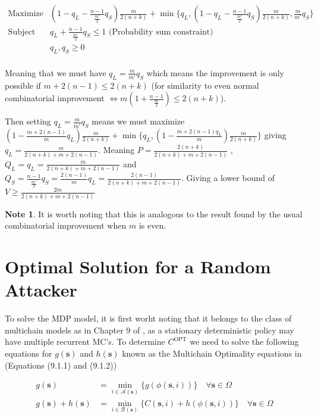 \documentclass[a4paper,10pt]{article}
\theoremstyle{definition}
\theoremstyle{definition}
\theoremstyle{remark}
\theoremstyle{definition}
\newtheorem*{note}{Note}
\begin{document}
$$\begin{array}{cc}
\text{Maximize} & (1-q_{L}-\frac{n-1}{ \frac{m'}{2}}q_{S}) \frac{m}{2(n+k)} + \min \{ q_{L}, (1-q_{L}-\frac{n-1}{\frac{m'}{2}}q_{S}) \frac{m}{2(n+k)} , \frac{m}{m'}q_{S} \}\\
\text{Subject to } & q_{L}+\frac{n-1}{\frac{m'}{2}}q_{S} \leq 1 \text{  (Probability sum constraint)} \\
     & q_{L},q_{S} \geq 0 \\
\end{array} $$

Meaning that we must have $q_{L}=\frac{m}{m'}q_{S}$ which means the improvement is only possible if $m+2(n-1) \leq 2(n+k)$ (for similarity to even normal combinatorial improvement $\iff m(1+\frac{n-1}{\frac{m}{2}}) \leq 2(n+k)$). 

Then setting $q_{L}=\frac{m}{m'}q_{S}$ means we must maximize $(1-\frac{m+2(n-1)}{m}q_{L})\frac{m}{2(n+k)}+\min\{ q_{L}, (1-\frac{m+2(n-1)q_{L}}{m})\frac{m}{2(n+k)} \}$ giving $q_{L}=\frac{m}{2(n+k)+m+2(n-1)}$. Meaning $P=\frac{2(n+k)}{2(n+k)+m+2(n-1)}$ , $Q_{L}=q_{L}=\frac{m}{2(n+k)+m+2(n-1)}$ and $Q_{S}=\frac{n-1}{\frac{m'}{2}}q_{S}=\frac{2(n-1)}{m}q_{L}=\frac{2(n-1)}{2(n+k)+m+2(n-1)}$. Giving a lower bound of $V \geq \frac{2m}{2(n+k)+m+2(n-1)}$

\begin{note}
It is worth noting that this is analogous to the result found by the usual combinatorial improvement when $m$ is even.
\end{note}



\section{Optimal Solution for a Random Attacker}
\label{Appendix:Optimal Solution for a Random Attacker}
To solve the MDP model, it is first worht noting that it belongs to the class of multichain models as in Chapter 9 of \cite{Puterman1994}, as a stationary deterministic policy may have multiple recurrent MC's. To determine $C^{\text{OPT}}$ we need to solve the following equations for $g(\bm{s})$ and $h(\bm{s})$ known as the Multichain Optimality equations in \cite{Puterman1994} (Equations (9.1.1) and (9.1.2))

\begin{align*}
g(\bm{s}) &= \min\limits_{i \in \mathcal{A}(\bm{s})} \{g(\phi(\bm{s},i)) \} \quad \forall \bm{s} \in \Omega \\
g(\bm{s})+h(\bm{s}) &= \min\limits_{i \in \mathcal{B}(\bm{s})} \{C(\bm{s},i)+h(\phi(\bm{s},i)) \} \quad \forall \bm{s} \in \Omega
\end{align*}
\end{document}
